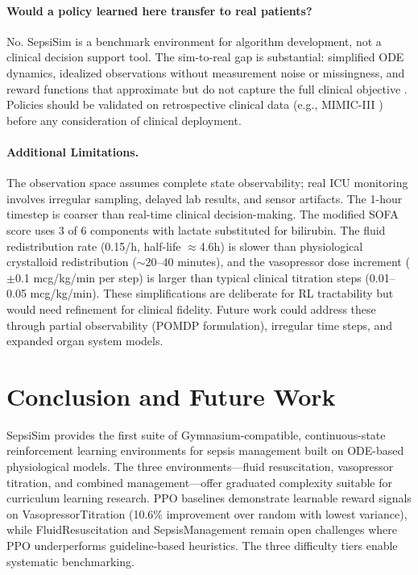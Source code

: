 \documentclass[11pt,a4paper]{article}
\begin{document}
\paragraph{Would a policy learned here transfer to real patients?}
No. SepsiSim is a benchmark environment for algorithm development, not a clinical decision support tool. The sim-to-real gap is substantial: simplified ODE dynamics, idealized observations without measurement noise or missingness, and reward functions that approximate but do not capture the full clinical objective \citep{gottesman2019guidelines}. Policies should be validated on retrospective clinical data (e.g., MIMIC-III \citep{johnson2016mimic}) before any consideration of clinical deployment.

\paragraph{Additional Limitations.}
The observation space assumes complete state observability; real ICU monitoring involves irregular sampling, delayed lab results, and sensor artifacts. The 1-hour timestep is coarser than real-time clinical decision-making. The modified SOFA score uses 3 of 6 components with lactate substituted for bilirubin. The fluid redistribution rate (0.15/h, half-life $\approx$4.6h) is slower than physiological crystalloid redistribution ($\sim$20--40 minutes), and the vasopressor dose increment ($\pm$0.1 mcg/kg/min per step) is larger than typical clinical titration steps (0.01--0.05 mcg/kg/min). These simplifications are deliberate for RL tractability but would need refinement for clinical fidelity. Future work could address these through partial observability (POMDP formulation), irregular time steps, and expanded organ system models.

\section{Conclusion and Future Work}

SepsiSim provides the first suite of Gymnasium-compatible, continuous-state reinforcement learning environments for sepsis management built on ODE-based physiological models. The three environments---fluid resuscitation, vasopressor titration, and combined management---offer graduated complexity suitable for curriculum learning research. PPO baselines demonstrate learnable reward signals on VasopressorTitration (10.6\% improvement over random with lowest variance), while FluidResuscitation and SepsisManagement remain open challenges where PPO underperforms guideline-based heuristics. The three difficulty tiers enable systematic benchmarking.
\end{document}

